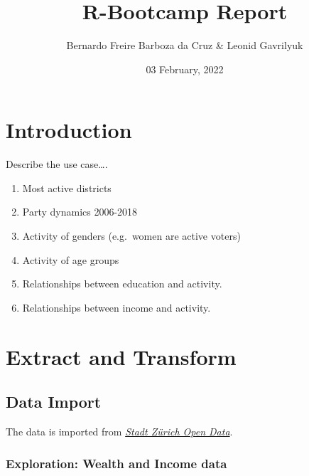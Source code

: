 \documentclass[
]{article}
\title{R-Bootcamp Report}
\author{Bernardo Freire Barboza da Cruz \& Leonid Gavrilyuk}
\date{03 February, 2022}
\providecommand{\tightlist}{%
  \setlength{\itemsep}{0pt}\setlength{\parskip}{0pt}}
\begin{document}
\maketitle

{
\setcounter{tocdepth}{2}
\tableofcontents
}
\pagebreak

\hypertarget{introduction}{%
\section{Introduction}\label{introduction}}

Describe the use case\ldots.

\begin{enumerate}
\def\labelenumi{\arabic{enumi}.}
\tightlist
\item
  Most active districts\\
\item
  Party dynamics 2006-2018\\
\item
  Activity of genders (e.g.~women are active voters)\\
\item
  Activity of age groups\\
\item
  Relationships between education and activity.\\
\item
  Relationships between income and activity.
\end{enumerate}

\pagebreak

\hypertarget{extract-and-transform}{%
\section{Extract and Transform}\label{extract-and-transform}}

\hypertarget{data-import}{%
\subsection{Data Import}\label{data-import}}

The data is imported from
\emph{\href{https://data.stadt-zuerich.ch/}{Stadt Zürich Open Data}}.

\hypertarget{exploration-wealth-and-income-data}{%
\subsubsection{Exploration: Wealth and Income
data}\label{exploration-wealth-and-income-data}}
\end{document}
